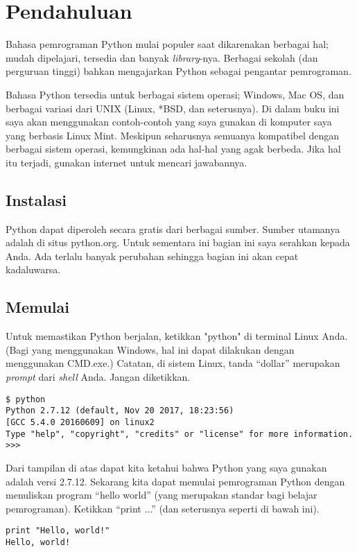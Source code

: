 \chapter{Pendahuluan}
Bahasa pemrograman Python mulai populer saat dikarenakan berbagai hal; mudah
dipelajari, tersedia dan banyak {\em library}-nya. Berbagai sekolah (dan
perguruan tinggi) bahkan mengajarkan Python sebagai pengantar pemrograman.

Bahasa Python tersedia untuk berbagai sistem operasi; Windows, Mac OS, dan
berbagai variasi dari UNIX (Linux, *BSD, dan seterusnya). Di dalam buku ini
saya akan menggunakan contoh-contoh yang saya gunakan di komputer saya yang
berbasis Linux Mint. Meskipun seharusnya semuanya kompatibel dengan berbagai
sistem operasi, kemungkinan ada hal-hal yang agak berbeda. Jika hal itu
terjadi, gunakan internet untuk mencari jawabannya.

\section{Instalasi}
Python dapat diperoleh secara gratis dari berbagai sumber. Sumber utamanya
adalah di situs python.org. Untuk sementara ini bagian ini saya serahkan kepada
Anda. Ada terlalu banyak perubahan sehingga bagian ini akan cepat kadaluwarsa.

\section{Memulai}
Untuk memastikan Python berjalan, ketikkan "python" di terminal Linux Anda.
(Bagi yang menggunakan Windows, hal ini dapat dilakukan dengan menggunakan
CMD.exe.) Catatan, di sistem Linux, tanda ``dollar'' merupakan {\em prompt}
dari {\em shell} Anda. Jangan diketikkan.

\begin{verbatim}
$ python
Python 2.7.12 (default, Nov 20 2017, 18:23:56) 
[GCC 5.4.0 20160609] on linux2
Type "help", "copyright", "credits" or "license" for more information.
>>> 
\end{verbatim}

Dari tampilan di atas dapat kita ketahui bahwa Python yang saya gunakan adalah
versi 2.7.12. Sekarang kita dapat memulai pemrograman Python dengan menuliskan
program ``hello world'' (yang merupakan standar bagi belajar pemrograman).
Ketikkan ``print ...'' (dan seterusnya seperti di bawah ini).

\begin{verbatim}
print "Hello, world!"
Hello, world!
\end{verbatim}

